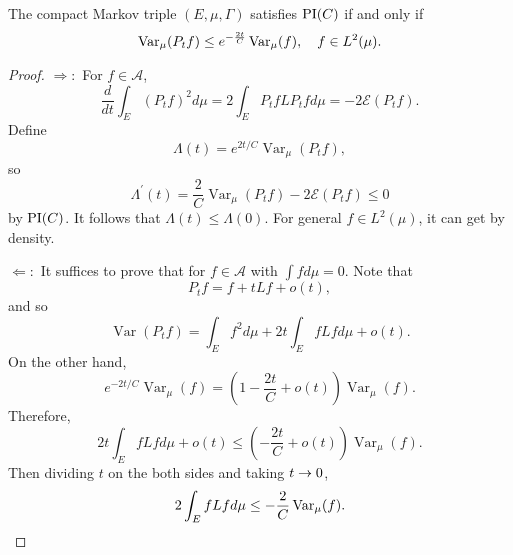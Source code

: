\begin{prop}
    The compact Markov triple $(E,\mu,\Gamma)$ satisfies $\operatorname{PI}(C)$ if and only if
    \begin{equation*}
    	\operatorname{Var}_\mu(P_t f) \leq e^{-\frac{2t}{C}}\operatorname{Var}_\mu(f),\quad f \in L^2(\mu).
    \end{equation*}
\end{prop}
\begin{proof}
    $\Rightarrow:$ For $f \in \mathcal{A}$,
    \begin{equation*}
    	\frac{d}{d t} \int_E\left(P_t f\right)^2 d \mu=2 \int_E P_t f L P_t f d \mu=-2 \mathcal{E}\left(P_t f\right).
    \end{equation*}
    Define
    \begin{equation*}
    	\Lambda(t)=e^{2 t / C} \operatorname{Var}_\mu\left(P_t f\right),
    \end{equation*}
    so
    \begin{equation*}
    	\Lambda^{\prime}(t)=\frac{2}{C} \operatorname{Var}_\mu\left(P_t f\right)-2 \mathcal{E}\left(P_t f\right) \leq 0
    \end{equation*}
    by $\operatorname{PI}(C)$. It follows that $\Lambda(t) \leq \Lambda(0)$. For general $f \in L^2(\mu)$, it can get by density.

    $\Leftarrow:$ It suffices to prove that for $f \in \mathcal{A}$ with $\int f d\mu = 0$. Note that
    \begin{equation*}
    	P_t f=f+t L f+o(t),
    \end{equation*}
    and so
    \begin{equation*}
    	\operatorname{Var}\left(P_t f\right)=\int_E f^2 d \mu+2 t \int_E f L f d \mu+o(t).
    \end{equation*}
    On the other hand,
    \begin{equation*}
    	e^{-2 t / C} \operatorname{Var}_\mu(f)=\left(1-\frac{2 t}{C}+o(t)\right) \operatorname{Var}_\mu(f).
    \end{equation*}
    Therefore,
    \begin{equation*}
    	2 t \int_E f L f d \mu+o(t) \leq \left(-\frac{2 t}{C}+o(t)\right) \operatorname{Var}_\mu(f).
    \end{equation*}
    Then dividing $t$ on the both sides and taking $t \rightarrow 0$,
    \begin{equation*}
    	2 \int_E f L f d \mu \leq-\frac{2}{C} \operatorname{Var}_\mu(f). \qedhere
    \end{equation*}
\end{proof}



